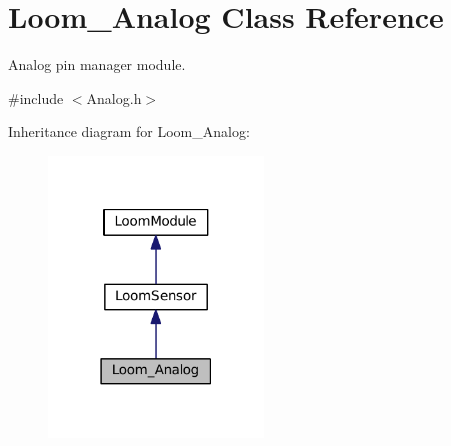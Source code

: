 \hypertarget{class_loom___analog}{}\section{Loom\+\_\+\+Analog Class Reference}
\label{class_loom___analog}


Analog pin manager module.  




{\ttfamily \#include $<$Analog.\+h$>$}



Inheritance diagram for Loom\+\_\+\+Analog\+:\nopagebreak
\begin{figure}[H]
\begin{center}
\leavevmode
\includegraphics[width=162pt]{class_loom___analog__inherit__graph}
\end{center}
\end{figure}
